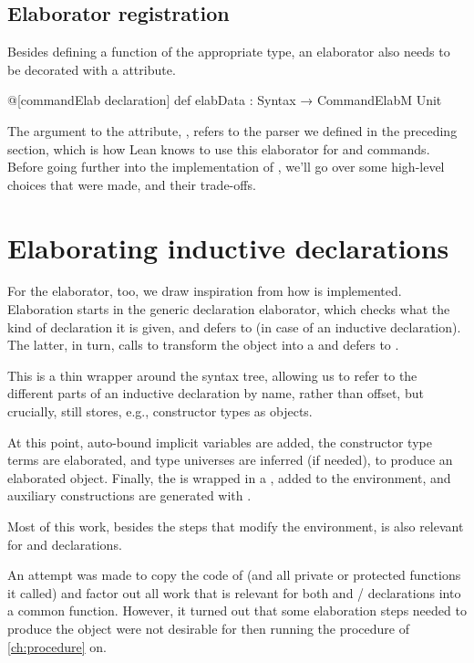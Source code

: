 \subsection*{Elaborator registration}
Besides defining a function of the appropriate type, an elaborator also needs to be decorated with a  attribute.

\begin{leancode}
  @[commandElab declaration] def elabData : Syntax → CommandElabM Unit
\end{leancode}

The argument to the attribute, , refers to the parser we defined in the preceding section, which is how Lean knows to use this elaborator for \data{} and \codata{} commands.
Before going further into the implementation of , we'll go over some high-level choices 
that were made, and their trade-offs.


\section{Elaborating inductive declarations}
For the elaborator, too, we draw inspiration from how \inductive{} is implemented.
Elaboration starts in the generic declaration elaborator, which checks what the kind of declaration it is given, and defers to  (in case of an inductive declaration). The latter, in turn, calls  to transform the  object into a  and defers to .

This  is a thin wrapper around the syntax tree, allowing us to refer to the different parts of an inductive declaration by name, rather than offset, but crucially, still stores, e.g., constructor types as  objects.

At this point, auto-bound implicit variables are added, the constructor type terms are elaborated, and type universes are inferred (if needed), to produce an elaborated  object. 
Finally, the  is wrapped in a , added to the environment, and auxiliary constructions are generated with .


Most of this work, besides the steps that modify the environment, is also relevant for \data{} and \codata{} declarations.

An attempt was made to copy the code of  (and all private or protected functions it called) and factor out all work that is relevant for both \inductive{} and \data{}/\codata{} declarations into a common function.
However, it turned out that some elaboration steps needed to produce the  object were not desirable for then running the procedure of \cref{ch:procedure} on.


